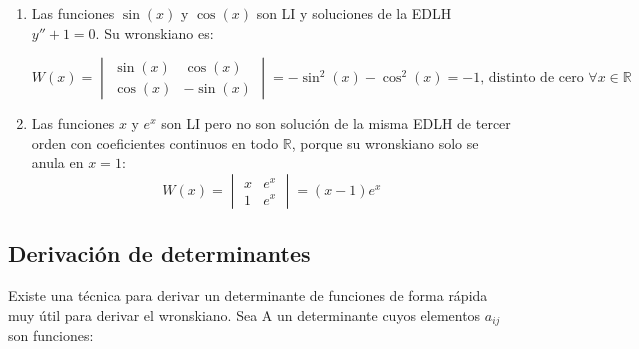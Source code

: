 \documentclass[a4paper,12pt,titlepage]{article}
\begin{document}
\begin{enumerate}
    \item Las funciones $\sin(x)$ y $\cos(x)$ son LI y soluciones de la EDLH $y'' + 1 =0$. Su wronskiano es:
    
    \begin{equation}
        W(x) = \begin{vmatrix}
        \sin(x) & \cos(x)\\
        \cos(x) & -\sin(x)    
        \end{vmatrix} = -\sin^2(x) - \cos^2(x) = -1 \text{, distinto de cero } \forall x \in \mathbb{R}
    \end{equation}

    \item Las funciones $x$ y $e^x$ son LI pero no son solución de la misma EDLH de tercer orden con coeficientes continuos en todo $\mathbb{R}$, porque su wronskiano solo se anula en $x=1$:
    \begin{equation}
        W(x) = \begin{vmatrix}
            x & e^x\\
            1 & e^x   
            \end{vmatrix} = (x-1)e^x
    \end{equation}
\end{enumerate}

\subsection{Derivación de determinantes}

Existe una técnica para derivar un determinante de funciones de forma rápida muy útil para derivar el wronskiano. Sea A un determinante cuyos elementos $a_{ij}$ son funciones:
\end{document}
